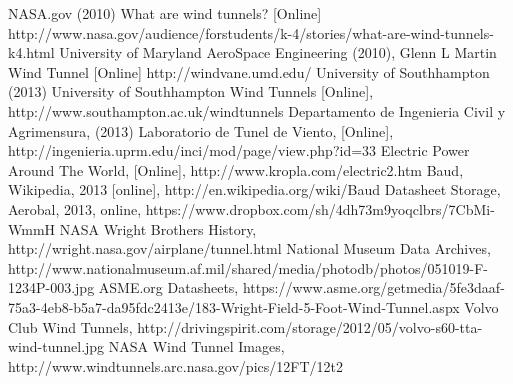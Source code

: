 \begin{thebibliography}{99}
		NASA.gov (2010) What are wind tunnels? [Online] http://www.nasa.gov/audience/forstudents/k-4/stories/what-are-wind-tunnels-k4.html
		University of Maryland AeroSpace Engineering (2010), Glenn L Martin Wind Tunnel [Online] http://windvane.umd.edu/
		University of Southhampton (2013) University of Southhampton Wind Tunnels [Online], http://www.southampton.ac.uk/windtunnels
		Departamento de Ingenieria Civil y Agrimensura, (2013) Laboratorio de Tunel de Viento, [Online], http://ingenieria.uprm.edu/inci/mod/page/view.php?id=33
		Electric Power Around The World, [Online], http://www.kropla.com/electric2.htm
			Baud, Wikipedia, 2013 [online], http://en.wikipedia.org/wiki/Baud
			Datasheet Storage, Aerobal, 2013, online, https://www.dropbox.com/sh/4dh73m9yoqclbrs/7CbMi-WmmH
			NASA Wright Brothers History, http://wright.nasa.gov/airplane/tunnel.html
			National Museum Data Archives, http://www.nationalmuseum.af.mil/shared/media/photodb/photos/051019-F-1234P-003.jpg
			ASME.org Datasheets, https://www.asme.org/getmedia/5fe3daaf-75a3-4eb8-b5a7-da95fdc2413e/183-Wright-Field-5-Foot-Wind-Tunnel.aspx
			Volvo Club Wind Tunnels, http://drivingspirit.com/storage/2012/05/volvo-s60-tta-wind-tunnel.jpg
		   NASA Wind Tunnel Images, http://www.windtunnels.arc.nasa.gov/pics/12FT/12t2
			
			
			
			
\end{thebibliography}